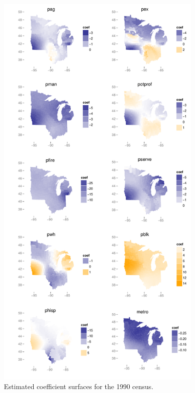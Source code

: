 	\begin{figure}
		\begin{center}
			\includegraphics[height=8in]{../../figures/poverty/1990.linear.coefficients.pdf}
			\caption{Estimated coefficient surfaces for the 1990 census.\label{fig:census-coefs-1990}}
		\end{center}
	\end{figure}
	
